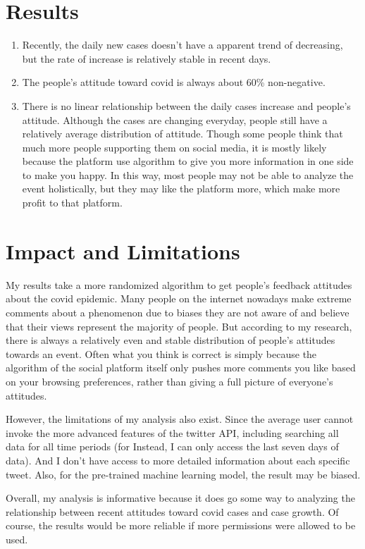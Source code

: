 \documentclass[a4paper, 12pt]{article}
\begin{document}
\section*{Results}
\begin{enumerate}
    \item Recently, the daily new cases doesn't have a apparent trend of decreasing, but the rate of increase is relatively stable in recent days.
    \item The people's attitude toward covid is always about 60\% non-negative.
    \item There is no linear relationship between the daily cases increase and people's attitude. Although the cases are changing everyday, people still have a relatively average distribution of attitude. Though some people think that much more people supporting them on social media, it is mostly likely because the platform use algorithm to give you more information in one side to make you happy. In this way, most people may not be able to analyze the event holistically, but they may like the platform more, which make more profit to that platform. 
\end{enumerate}



\section*{Impact and Limitations}
My results take a more randomized algorithm to get people's feedback attitudes about the covid epidemic. Many people on the internet nowadays make extreme comments about a phenomenon due to biases they are not aware of and believe that their views represent the majority of people. But according to my research, there is always a relatively even and stable distribution of people's attitudes towards an event. Often what you think is correct is simply because the algorithm of the social platform itself only pushes more comments you like based on your browsing preferences, rather than giving a full picture of everyone's attitudes.

However, the limitations of my analysis also exist. Since the average user cannot invoke the more advanced features of the twitter API, including searching all data for all time periods (for Instead, I can only access the last seven days of data). And I don't have access to more detailed information about each specific tweet. Also, for the pre-trained machine learning model, the result may be biased.

Overall, my analysis is informative because it does go some way to analyzing the relationship between recent attitudes toward covid cases and case growth. Of course, the results would be more reliable if more permissions were allowed to be used.
\end{document}
